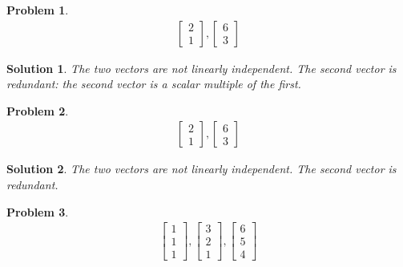 \documentclass{article}
\newtheorem{problem}{Problem}
\newtheorem*{solution}{Solution}
\begin{document}
\begin{problem}
\begin{align*}
\begin{bmatrix} 2 \\ 1 \end{bmatrix}, 
\begin{bmatrix} 6 \\ 3 \end{bmatrix}
\end{align*}
\end{problem}

\begin{solution}
The two vectors are not linearly independent. The second vector is redundant: the second vector is a scalar multiple of the first.
\end{solution}

\begin{problem}
\begin{align*}
\begin{bmatrix} 2 \\ 1 \end{bmatrix}, 
\begin{bmatrix} 6 \\ 3 \end{bmatrix}
\end{align*}
\end{problem}

\begin{solution}
The two vectors are not linearly independent. The second vector is redundant.
\end{solution}

\begin{problem}
\begin{align*}
\begin{bmatrix} 1 \\ 1 \\ 1 \end{bmatrix}, 
\begin{bmatrix} 3 \\ 2 \\ 1 \end{bmatrix},
\begin{bmatrix} 6 \\ 5 \\ 4 \end{bmatrix}
\end{align*}
\end{problem}
\end{document}
